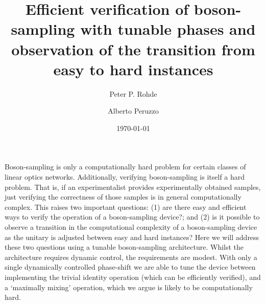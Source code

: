 \documentclass[aps,pra,twocolumn,amsmath,amssymb,nofootinbib,superscriptaddress]{revtex4}
\begin{document}


%
%

\title{Efficient verification of boson-sampling with tunable phases and observation of the transition from easy to hard instances}

%
%


\author{Peter P. Rohde}

\author{Alberto Peruzzo}

\date{\today}

\frenchspacing

%
%

\begin{abstract}
\end{abstract}

\maketitle

%
%

Boson-sampling is only a computationally hard problem for certain classes of linear optics networks. Additionally, verifying boson-sampling is itself a hard problem. That is, if an experimentalist provides experimentally obtained samples, just verifying the correctness of those samples is in general computationally complex. This raises two important questions: (1) are there easy and efficient ways to verify the operation of a boson-sampling device?; and (2) is it possible to observe a transition in the computational complexity of a boson-sampling device as the unitary is adjusted between easy and hard instances? Here we will address these two questions using a tunable boson-sampling architecture. Whilst the architecture requires dynamic control, the requirements are modest. With only a single dynamically controlled phase-shift we are able to tune the device between implementing the trivial identity operation (which can be efficiently verified), and a `maximally mixing' operation, which we argue is likely to be computationally hard.
\end{document}
